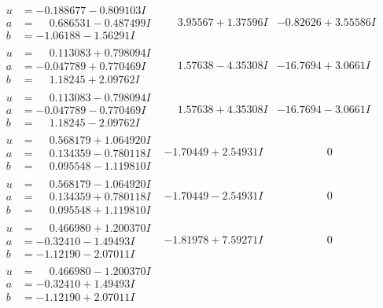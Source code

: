 \documentclass[1p]{elsarticle_modified}
\theoremstyle{definition}
\begin{document}
$$\begin{array}{c|c|c}
\begin{aligned}
u &= -0.188677 - 0.809103 I \\
a &= \phantom{-}0.686531 - 0.487499 I \\
b &= -1.06188 - 1.56291 I\end{aligned}
 & \phantom{-}3.95567 + 1.37596 I & -0.82626 + 3.55586 I \\ \hline\begin{aligned}
u &= \phantom{-}0.113083 + 0.798094 I \\
a &= -0.047789 + 0.770469 I \\
b &= \phantom{-}1.18245 + 2.09762 I\end{aligned}
 & \phantom{-}1.57638 - 4.35308 I & -16.7694 + 3.0661 I \\ \hline\begin{aligned}
u &= \phantom{-}0.113083 - 0.798094 I \\
a &= -0.047789 - 0.770469 I \\
b &= \phantom{-}1.18245 - 2.09762 I\end{aligned}
 & \phantom{-}1.57638 + 4.35308 I & -16.7694 - 3.0661 I \\ \hline\begin{aligned}
u &= \phantom{-}0.568179 + 1.064920 I \\
a &= \phantom{-}0.134359 - 0.780118 I \\
b &= \phantom{-}0.095548 - 1.119810 I\end{aligned}
 & -1.70449 + 2.54931 I & \phantom{-0.000000 } 0 \\ \hline\begin{aligned}
u &= \phantom{-}0.568179 - 1.064920 I \\
a &= \phantom{-}0.134359 + 0.780118 I \\
b &= \phantom{-}0.095548 + 1.119810 I\end{aligned}
 & -1.70449 - 2.54931 I & \phantom{-0.000000 } 0 \\ \hline\begin{aligned}
u &= \phantom{-}0.466980 + 1.200370 I \\
a &= -0.32410 - 1.49493 I \\
b &= -1.12190 - 2.07011 I\end{aligned}
 & -1.81978 + 7.59271 I & \phantom{-0.000000 } 0 \\ \hline\begin{aligned}
u &= \phantom{-}0.466980 - 1.200370 I \\
a &= -0.32410 + 1.49493 I \\
b &= -1.12190 + 2.07011 I\end{aligned}

\end{array}$$
\end{document}
